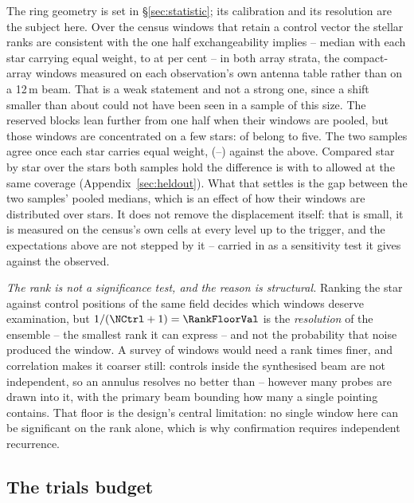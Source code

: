 The ring geometry is set in \S\ref{sec:statistic}; its calibration and its
resolution are the subject here. Over the \VerNTested{} census windows that
retain a control vector the stellar ranks are consistent with the one half
exchangeability implies -- median \BkRankBalSurv{} with each star carrying
equal weight, \BkRankBalSurvLo{} to \BkRankBalSurvHi{} at \CeCovPct{} per
cent -- in both array
strata, the compact-array windows measured on each observation's own antenna
table rather than on a 12\,m beam. That is a weak statement and not a strong
one, since a shift smaller than about \VerKsPowerAca{} could not have been
seen in a sample of this size. The reserved blocks lean further from one half
when their windows are pooled, but those windows are concentrated on a few
stars: \BkRankTopFiveWin{} of \HoWin{} belong to five. The two
samples agree once each star carries equal weight, \BkRankBalHo{}
(\BkRankBalHoLo--\BkRankBalHoHi) against the \BkRankBalSurv{} above.
Compared star by star over the \BkRankPairedStars{} stars both samples hold
the difference is \BkRankPaired{} with \BkRankPairedLo{} to
\BkRankPairedHi{} allowed at the same coverage
(Appendix~\ref{sec:heldout}). What that settles is
the gap between the two samples' pooled medians, which is an effect of how
their windows are distributed over stars. It does not remove the displacement
itself: that is small, it is measured on the census's own cells at every level
up to the trigger, and the expectations above are not stepped by it -- carried
in as a sensitivity test it gives \CeExpX{} against the \CeObs{} observed.

\emph{The rank is not a significance test, and the reason is structural.}
Ranking the star against \NCtrl{} control positions of the same field
decides which windows deserve examination, but $1/(\NCtrl+1)=\RankFloorVal$
is the \emph{resolution} of the ensemble -- the smallest rank it can
express -- and not the probability that noise produced the window. A survey
of \NWindows{} windows would need a rank \BonfRankRatio{} times finer, and
correlation makes it coarser still: controls inside the synthesised beam are
not independent, so an annulus resolves no better than
\RankEffLo--\RankEffHi{} however many probes are drawn into it, with the
primary beam bounding how many a single pointing contains. That floor is the
design's central limitation: no single window here can be significant on the
rank alone, which is why confirmation requires independent recurrence.

\subsection{The trials budget}

